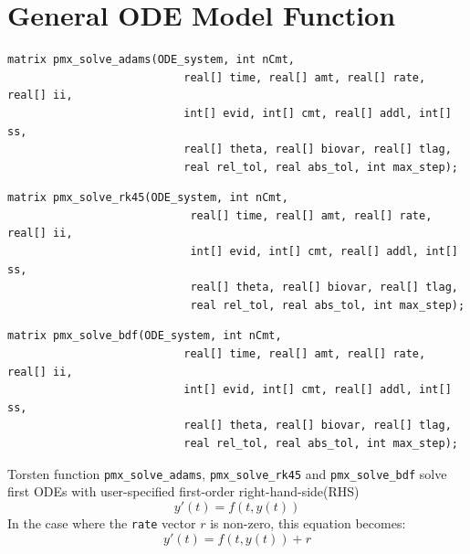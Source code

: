 \documentclass[11pt, reqno, oneside]{amsbook}
\numberwithin{equation}{chapter}
\numberwithin{figure}{chapter}
\numberwithin{table}{chapter}
\theoremstyle{remark}
\begin{document}
\section{General ODE Model Function}
\label{sec:org36c0d91}
\begin{verbatim}
matrix pmx_solve_adams(ODE_system, int nCmt,
                           real[] time, real[] amt, real[] rate, real[] ii,
                           int[] evid, int[] cmt, real[] addl, int[] ss,
                           real[] theta, real[] biovar, real[] tlag,                      
                           real rel_tol, real abs_tol, int max_step);
\end{verbatim}
\begin{verbatim}
matrix pmx_solve_rk45(ODE_system, int nCmt,
                            real[] time, real[] amt, real[] rate, real[] ii,
                            int[] evid, int[] cmt, real[] addl, int[] ss,
                            real[] theta, real[] biovar, real[] tlag,                      
                            real rel_tol, real abs_tol, int max_step);
\end{verbatim}
\begin{verbatim}
matrix pmx_solve_bdf(ODE_system, int nCmt,
                           real[] time, real[] amt, real[] rate, real[] ii,
                           int[] evid, int[] cmt, real[] addl, int[] ss,
                           real[] theta, real[] biovar, real[] tlag,                      
                           real rel_tol, real abs_tol, int max_step);
\end{verbatim}
Torsten function \texttt{pmx\_solve\_adams}, \texttt{pmx\_solve\_rk45} and
\texttt{pmx\_solve\_bdf} solve first ODEs with
user-specified first-order right-hand-side(RHS)
\begin{equation*}
y'(t) = f(t, y(t))
\end{equation*}
In the case where the \texttt{rate} vector \(r\) is non-zero, this equation becomes:
\begin{equation*}
y'(t) = f(t, y(t)) + r
\end{equation*}
\end{document}
